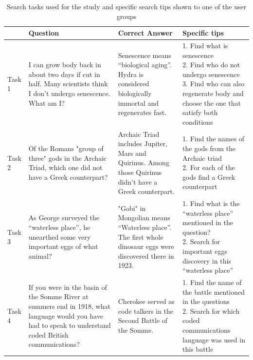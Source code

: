 \documentclass{sig-alternate}
\begin{document}
\begin{table}[tbh]
\centering
\caption{Search tasks used for the study and specific search tips shown to one of the user groups}
\label{table:tasks}
\vspace{-2mm}
\begin{tabular}{|p{1cm}|p{4.5cm}|p{4.2cm}|p{6.0cm}|} \hline
 & Question & Correct Answer & Specific tips \\ \hline
Task 1 & I can grow body back in about two days if cut in half. Many scientists think I don't undergo senescence. What am I? & Senescence means ``biological aging''. Hydra is considered biologically immortal and regenerates fast. & \parbox[t]{6cm}{
1. Find what is senescence\\
2. Find who do not undergo senescence\\
3. Find who can also regenerate body and choose the one that satisfy both conditions} \\ \hline
Task 2 & Of the Romans "group of three" gods in the Archaic Triad, which one did not have a Greek counterpart? & Archaic Triad includes Jupiter, Mars and Quirinus. Among those Quirinus didn't have a Greek counterpart. &
\parbox[t]{6cm}{
1. Find the names of the gods from the Archaic triad\\
2. For each of the gods find a Greek counterpart
}\\ \hline
Task 3 & As George surveyed the ``waterless place'', he unearthed some very important eggs of what animal? & "Gobi" in Mongolian means ``Waterless place''. The first whole dinosaur eggs were discovered there in 1923. & \parbox[t]{6cm}{
1. Find what is the ``waterless place'' mentioned in the question?\\
2. Search for important eggs discovery in this ``waterless place''}\\ \hline
Task 4 & If you were in the basin of the Somme River at summers end in 1918, what language would you have had to speak to understand coded British communications? & Cherokee served as code talkers in the Second Battle of the Somme. & \parbox[t]{6cm}{
1. Find the name of the battle mentioned in the questions\\
2. Search for which coded communications language was used in this battle\\
} \\ \hline
\end{tabular}
\end{table}
\end{document}

